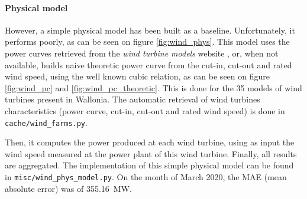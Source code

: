 \documentclass[a4paper, 12pt]{article}
\begin{document}
    \paragraph{Physical model}
	However, a simple physical model has been built as a baseline. Unfortunately, it performs poorly, as can be seen on figure \ref{fig:wind_phys}. This model uses the power curves retrieved from the \emph{wind turbine models} website \parencite{wind-turbine-models}, or, when not available, builds naive theoretic power curve from the cut-in, cut-out and rated wind speed, using the well known cubic relation, as can be seen on figure \ref{fig:wind_pc} and \ref{fig:wind_pc_theoretic}. This is done for the 35 models of wind turbines present in Wallonia. The automatic retrieval of wind turbines characteristics (power curve, cut-in, cut-out and rated wind speed) is done in \texttt{cache/wind\_farms.py}.

	Then, it computes the power produced at each wind turbine, using as input the wind speed measured at the power plant of this wind turbine. Finally, all results are aggregated. The implementation of this simple physical model can be found in \texttt{misc/wind\_phys\_model.py}. On the month of March 2020, the MAE (mean absolute error) was of \SI{355.16}{MW}. 
\end{document}
